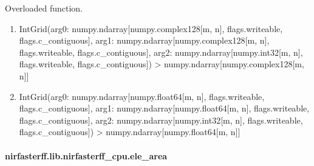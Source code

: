 \documentclass[letterpaper,10pt,english]{sphinxmanual}
\begin{document}
\begin{fulllineitems}
\label{\detokenize{_autosummary/nirfasterff.lib.nirfasterff_cpu.IntGrid:nirfasterff.lib.nirfasterff_cpu.IntGrid}}
\pysigstartsignatures
\pysiglinewithargsret
{}
{\sphinxparamcomma {}}
{}
\pysigstopsignatures
\sphinxAtStartPar
Overloaded function.
\begin{enumerate}
%
\item {} 
\sphinxAtStartPar
IntGrid(arg0: numpy.ndarray{[}numpy.complex128{[}m, n{]}, flags.writeable, flags.c\_contiguous{]}, arg1: numpy.ndarray{[}numpy.complex128{[}m, n{]}, flags.writeable, flags.c\_contiguous{]}, arg2: numpy.ndarray{[}numpy.int32{[}m, n{]}, flags.writeable, flags.c\_contiguous{]}) \sphinxhyphen{}\textgreater{} numpy.ndarray{[}numpy.complex128{[}m, n{]}{]}

\item {} 
\sphinxAtStartPar
IntGrid(arg0: numpy.ndarray{[}numpy.float64{[}m, n{]}, flags.writeable, flags.c\_contiguous{]}, arg1: numpy.ndarray{[}numpy.float64{[}m, n{]}, flags.writeable, flags.c\_contiguous{]}, arg2: numpy.ndarray{[}numpy.int32{[}m, n{]}, flags.writeable, flags.c\_contiguous{]}) \sphinxhyphen{}\textgreater{} numpy.ndarray{[}numpy.float64{[}m, n{]}{]}

\end{enumerate}

\end{fulllineitems}


\sphinxstepscope


\paragraph{nirfasterff.lib.nirfasterff\_cpu.ele\_area}
\label{\detokenize{_autosummary/nirfasterff.lib.nirfasterff_cpu.ele_area:nirfasterff-lib-nirfasterff-cpu-ele-area}}\label{\detokenize{_autosummary/nirfasterff.lib.nirfasterff_cpu.ele_area::doc}}
\end{document}
